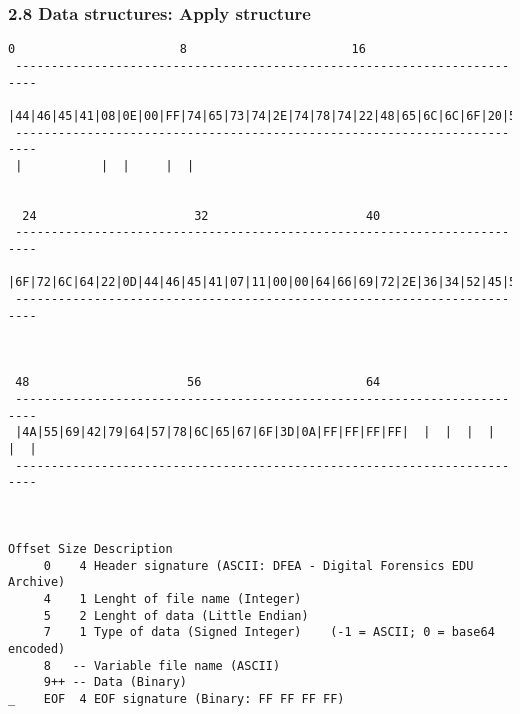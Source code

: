 \begin{frame}[fragile]
	\frametitle{2.8 Data structures: Apply structure}
\begin{lstlisting}[basicstyle=\tiny]
  0                       8                       16                      
 ------------------------------------------------------------------------- 
 |44|46|45|41|08|0E|00|FF|74|65|73|74|2E|74|78|74|22|48|65|6C|6C|6F|20|57|
 -------------------------------------------------------------------------
 |           |  |     |  |                                             


  24                      32                      40
 -------------------------------------------------------------------------
 |6F|72|6C|64|22|0D|44|46|45|41|07|11|00|00|64|66|69|72|2E|36|34|52|45|5A|
 -------------------------------------------------------------------------
                   


 48                      56                       64
 -------------------------------------------------------------------------
 |4A|55|69|42|79|64|57|78|6C|65|67|6F|3D|0A|FF|FF|FF|FF|  |  |  |  |  |  |
 -------------------------------------------------------------------------



Offset Size Description
     0    4 Header signature (ASCII: DFEA - Digital Forensics EDU Archive)
     4    1 Lenght of file name (Integer)
     5    2 Lenght of data (Little Endian)
     7    1 Type of data (Signed Integer)    (-1 = ASCII; 0 = base64 encoded)
     8   -- Variable file name (ASCII)
     9++ -- Data (Binary)
_    EOF  4 EOF signature (Binary: FF FF FF FF)
\end{lstlisting}
\end{frame}


